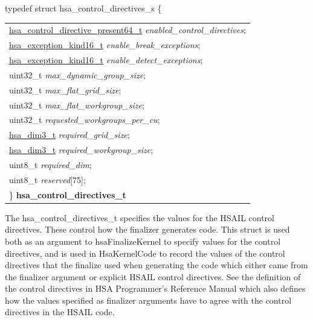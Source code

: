 \documentclass[final]{book}
\newcommand{\reffld}[1]{\textit{#1}}
\begin{document}
\begin{appendices}
\noindent\begin{tcolorbox}[breakable,nobeforeafter,arc=0mm,colframe=white,colback=lightgray,left=0mm]
typedef struct  hsa_control_directives_s \{
\vspace{-3.5mm}\begin{longtable}{@{}p{\textwidth}}
\hspace{1.7em}\hyperlink{group--FinalizerCoreApi-1gabcb5b180378955bdddf0d50976f1e384}{hsa_control_directive_present64_t} \reffld{enabled_control_directives};\\
\hspace{1.7em}\hyperlink{group--FinalizerCoreApi-1ga79491dd37db36bb84058cccceea56fa7}{hsa_exception_kind16_t} \reffld{enable_break_exceptions};\\
\hspace{1.7em}\hyperlink{group--FinalizerCoreApi-1ga79491dd37db36bb84058cccceea56fa7}{hsa_exception_kind16_t} \reffld{enable_detect_exceptions};\\
\hspace{1.7em}uint32_t \reffld{max_dynamic_group_size};\\
\hspace{1.7em}uint32_t \reffld{max_flat_grid_size};\\
\hspace{1.7em}uint32_t \reffld{max_flat_workgroup_size};\\
\hspace{1.7em}uint32_t \reffld{requested_workgroups_per_cu};\\
\hspace{1.7em}\hyperlink{group--RuntimeCommon-1ga6f7883588491965c45382cd996351aa2}{hsa_dim3_t} \reffld{required_grid_size};\\
\hspace{1.7em}\hyperlink{group--RuntimeCommon-1ga6f7883588491965c45382cd996351aa2}{hsa_dim3_t} \reffld{required_workgroup_size};\\
\hspace{1.7em}uint8_t \reffld{required_dim};\\
\hspace{1.7em}uint8_t \reffld{reserved}[75];\\
\}  \hypertarget{group--FinalizerCoreApi-1ga40030e03c0503b0f2c704f6cf6002add}{\textbf{hsa_control_directives_t}}
\end{longtable}

\end{tcolorbox}
The hsa_control_directives_t specifies the values for the HSAIL control directives. These control how the finalizer generates code. This struct is used both as an argument to hsaFinalizeKernel to specify values for the control directives, and is used in HsaKernelCode to record the values of the control directives that the finalize used when generating the code which either came from the finalizer argument or explicit HSAIL control directives. See the definition of the control directives in HSA Programmer's Reference Manual which also defines how the values specified as finalizer arguments have to agree with the control directives in the HSAIL code.


\end{appendices}
\end{document}
